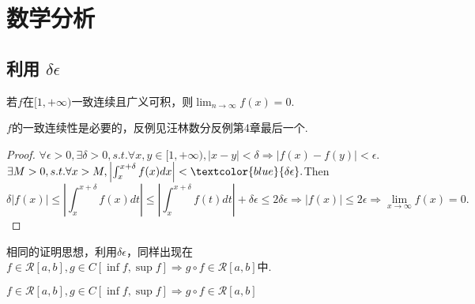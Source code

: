 \section{数学分析}

\subsection{利用 \texorpdfstring{$\delta \epsilon$}{delta epsilon}}


\begin{theorem}
    若$f$在$[1,+\infty)$一致连续且广义可积，则$\lim_{n\to \infty}f(x)=0$.
\end{theorem}

\begin{note}
    $f$的一致连续性是必要的，反例见汪林数分反例第4章最后一个.
\end{note}

\begin{proof}
    $\forall \epsilon>0,\exists \delta>0,s.t.\forall x,y\in [1,+\infty),\left|x-y\right|<\delta\Rightarrow \left|f(x)-f(y)\right|<\epsilon.$ $\exists M>0,s.t.\forall x>M,\left|\int_{x}^{x+\delta}f(x)dx\right|<\textcolor{blue}{\delta\epsilon}.$Then
    $$\delta \left|f(x)\right|\le  \left|\int_{x}^{x+\delta}f(x)dt\right|\le \left|\int_{x}^{x+\delta}f(t)dt\right|+\delta \epsilon\le 2\delta \epsilon\Rightarrow \left|f(x)\right|\le 2\epsilon\Rightarrow \lim_{x\to \infty}f(x)=0.$$
\end{proof}

\begin{note}
    相同的证明思想，利用$\delta \epsilon$，同样出现在$f\in \mathscr{R}[a,b],g\in C[\inf f,\sup f]\Rightarrow g\circ f\in \mathscr{R}[a,b]$中.
\end{note}

\begin{theorem}\label{memeda22}
    $f\in \mathscr{R}[a,b],g\in C[\inf f,\sup f]\Rightarrow g\circ f\in \mathscr{R}[a,b]$
\end{theorem}

